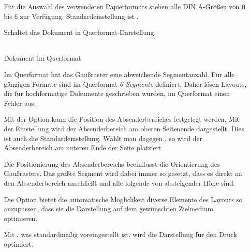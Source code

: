 Für die Auswahl des verwendeten Papierformats stehen alle DIN A-Größen von
0 bis 6 zur Verfügung. Standardeinstellung ist .

\begin{Declaration}
\end{Declaration}

Schaltet das Dokument in Querformat-Darstellung.

\begin{minipage}{0.45\textwidth}\sffamily\centering
  {}\\
  Dokument im Querformat
\end{minipage}


\begin{important}
  Im Querformat hat das Gaußraster eine abweichende
  Segmentanzahl. Für alle gängigen Formate sind im Querformat \emph{6 Segmente}
  definiert. Daher lösen Layouts, die für hochformatige Dokumente
  geschrieben wurden, im Querformat einen Fehler aus.
\end{important}


\begin{Declaration}
\end{Declaration}

Mit der Option  kann die Position des Absenderbereiches
festgelegt werden. Mit der Einstellung  wird
der Absenderbereich am oberen Seitenende dargestellt. Dies ist auch die
Standardeinstellung. Wählt man dagegen , so
wird der Absenderbereich am unteren Ende der Seite platziert

\begin{important}
  Die Positionierung des Absenderbereichs beeinflusst die Orientierung des
  Gaußrasters. Das größte Segment wird dabei immer so gesetzt, dass es direkt
  an den Absenderbereich anschließt und alle folgende von absteigender Höhe sind.
\end{important}


\begin{Declaration}
\end{Declaration}

Die Option  bietet die automatische Möglichkeit diverse Elemente
des Layouts so anzupassen, dass sie die Darstellung auf dem gewünschten
Zielmedium optimieren.

Mit , was standardmäßig voreingestellt ist,
wird die Darstellung für den Druck optimiert.

